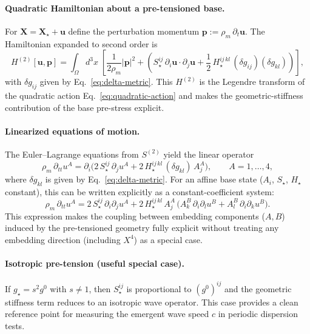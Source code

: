 \paragraph{Quadratic Hamiltonian about a pre-tensioned base.}
For $\mathbf X=\mathbf X_\star+\mathbf u$ define the perturbation momentum
$\mathbf p := \rho_m\,\partial_t\mathbf u$.
The Hamiltonian expanded to second order is
\begin{equation}
  H^{(2)}[\mathbf u,\mathbf p]
  =
  \int_{\Omega} d^3x\;
  \left[
    \frac{1}{2\rho_m}|\mathbf p|^2
    +
    \left(
      S_\star^{ij}\,\partial_i\mathbf u\cdot\partial_j\mathbf u
      +
      \frac12\,H_\star^{ij\,kl}\,(\delta g_{ij})(\delta g_{kl})
    \right)
  \right],
  \label{eq:quadratic-hamiltonian}
\end{equation}
with $\delta g_{ij}$ given by Eq.~\eqref{eq:delta-metric}.
This $H^{(2)}$ is the Legendre transform of the quadratic action
Eq.~\eqref{eq:quadratic-action} and makes the geometric-stiffness contribution of the base pre-stress explicit.

\paragraph{Linearized equations of motion.}
The Euler--Lagrange equations from $S^{(2)}$ yield the linear operator
\begin{equation}
  \rho_m\,\partial_{tt}u^A
  =
  \partial_i\Big(
    2\,S_\star^{ij}\,\partial_ju^A
    +
    2\,H_\star^{ij\,kl}\,(\delta g_{kl})\,A_j^A
  \Big),
  \qquad A=1,\dots,4,
  \label{eq:linearized-pde-general}
\end{equation}
where $\delta g_{kl}$ is given by Eq.~\eqref{eq:delta-metric}. For an affine base state
($A_i$, $S_\star$, $H_\star$ constant), this can be written explicitly as a constant-coefficient system:
\begin{equation}
  \rho_m\,\partial_{tt}u^A
  =
  2\,S_\star^{ij}\,\partial_i\partial_ju^A
  +
  2\,H_\star^{ij\,kl}\,A_j^A\,
  \Big(
    A_k^B\,\partial_i\partial_lu^B + A_l^B\,\partial_i\partial_ku^B
  \Big).
  \label{eq:linearized-pde-constant-coeff}
\end{equation}
This expression makes the coupling between embedding components ($A,B$) induced by the pre-tensioned geometry fully explicit
without treating any embedding direction (including $X^4$) as a special case.

\paragraph{Isotropic pre-tension (useful special case).}
If $g_\star=s^2 g^0$ with $s\neq 1$, then $S_\star^{ij}$ is proportional to $(g^0)^{ij}$
and the geometric stiffness term reduces to an isotropic wave operator.
This case provides a clean reference point for measuring the emergent wave speed $c$ in periodic dispersion tests.

